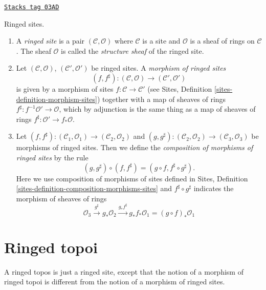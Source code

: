 \begin{definition}
\label{sites-modules-definition-ringed-site}
\href{https://stacks.math.columbia.edu/tag/03AD}{\texttt{Stacks tag 03AD}}

Ringed sites.
\begin{enumerate}
\item A {\it ringed site} is a pair $(\mathcal{C}, \mathcal{O})$
where $\mathcal{C}$ is a site and $\mathcal{O}$ is a sheaf of rings
on $\mathcal{C}$. The sheaf $\mathcal{O}$ is called the
{\it structure sheaf} of the ringed site.
\item Let $(\mathcal{C}, \mathcal{O})$, $(\mathcal{C}', \mathcal{O}')$ be ringed
sites. A {\it morphism of ringed sites}
$$
(f, f^\sharp) :
(\mathcal{C}, \mathcal{O})
\longrightarrow
(\mathcal{C}', \mathcal{O}')
$$
is given by a morphism of sites $f : \mathcal{C} \to \mathcal{C}'$
(see Sites, Definition \ref{sites-definition-morphism-sites})
together with a map of sheaves of rings
$f^\sharp : f^{-1}\mathcal{O}' \to \mathcal{O}$, which by adjunction
is the same thing as a map of sheaves of rings
$f^\sharp : \mathcal{O}' \to f_*\mathcal{O}$.
\item Let
$(f, f^\sharp) :
(\mathcal{C}_1, \mathcal{O}_1) \to (\mathcal{C}_2, \mathcal{O}_2)$ and
$(g, g^\sharp) :
(\mathcal{C}_2, \mathcal{O}_2) \to (\mathcal{C}_3, \mathcal{O}_3)$
be morphisms of ringed sites. Then we define
the {\it composition of morphisms of ringed sites}
by the rule
$$
(g, g^\sharp) \circ (f, f^\sharp) = (g \circ f, f^\sharp \circ g^\sharp).
$$
Here we use composition of morphisms of sites defined in
Sites, Definition \ref{sites-definition-composition-morphisms-sites}
and $f^\sharp \circ g^\sharp$ indicates the morphism of sheaves of
rings
$$
\mathcal{O}_3 \xrightarrow{g^\sharp} g_*\mathcal{O}_2
\xrightarrow{g_*f^\sharp} g_*f_*\mathcal{O}_1 = (g \circ f)_*\mathcal{O}_1
$$
\end{enumerate}
\end{definition}

\section{Ringed topoi}
\label{sites-modules-section-ringed-topoi}
A ringed topos is just a ringed site, except that the notion of
a morphism of ringed topoi is different from the notion of a morphism
of ringed sites.

